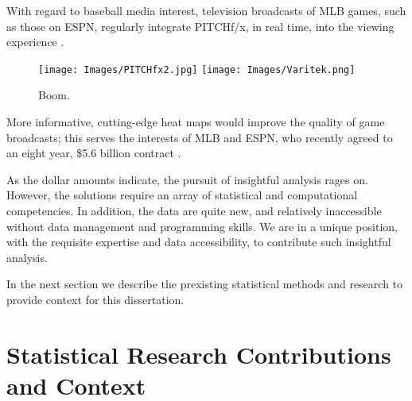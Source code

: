 With regard to baseball media interest, television broadcasts of MLB\textsuperscript{\textregistered} games, such as those on ESPN, regularly integrate PITCHf/x\textsuperscript{\textregistered}, in real time, into the viewing experience \citep{Cross2015}. 
        \begin{figure}[H]
      	\centering
      	\texttt{[image: Images/PITCHfx2.jpg]} 
      	\texttt{[image: Images/Varitek.png]} 
      	\caption{Boom.}
      	\end{figure} 
More informative, cutting-edge heat maps would improve the quality of game broadcasts; this serves the interests of MLB\textsuperscript{\textregistered} and  ESPN\textsuperscript{\textregistered}, who recently agreed to an eight year, \$5.6 billion contract \citep{Newman2012}.

As the dollar amounts indicate, the pursuit of insightful analysis rages on. However, the solutions require an array of statistical and computational competencies. In addition, the data are quite new, and relatively inaccessible without data management and programming skills. We are in a unique position, with the requisite expertise and data accessibility, to contribute such insightful analysis.

In the next section we describe the prexisting statistical methods and research to provide context for this dissertation.


\section{Statistical Research Contributions and Context}


